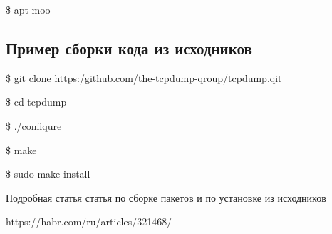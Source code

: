 \documentclass[oneside, final, 14pt]{extreport} %
\begin{document}
\$ apt moo

\subsection{Пример сборки кода из исходников}


    

\$ git clone https:/github.com/the-tcpdump-qroup/tcpdump.qit

\$ cd tcpdump

\$ ./confiqure

\$ make

\$ sudo make install

\vspace*{\baselineskip}

Подробная \href{https://habr.com/ru/articles/321468/}{статья} статья по сборке пакетов и по установке из исходников

https://habr.com/ru/articles/321468/



\end{document}
